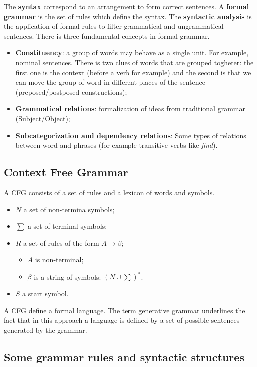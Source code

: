 
The \textbf{syntax} correspond to an arrangement to form correct sentences. A \textbf{formal grammar} is the set of rules which define the syntax. The \textbf{syntactic analysis} is the application of formal rules to filter grammatical and ungrammatical sentences. There is three fundamental concepts in formal grammar.

\begin{itemize}
	\item \textbf{Constituency}: a group of words may behave as a single unit. For example, nominal sentences. There is two clues of words that are grouped togheter: the first one is the context (before a verb for example) and the second is that we can move the group of word in different places of the sentence (preposed/postposed constructions);
	\item \textbf{Grammatical relations}: formalization of ideas from traditional grammar (Subject/Object);
	\item \textbf{Subcategorization and dependency relations}: Some types of relations between word and phrases (for example transitive verbs like \textit{find}).
\end{itemize}

\subsection{Context Free Grammar}

A CFG consists of a set of rules and a lexicon of words and symbols.
\begin{itemize}
	\item $N$ a set of non-termina symbols;
	\item $\sum$ a set of terminal symbols;
	\item $R$ a set of rules of the form $A \rightarrow \beta$;
	\begin{itemize}
		\item $A$ is non-terminal;
		\item $\beta$ is a string of symbols: $(N \cup \sum)^*$.
	\end{itemize}
	\item $S$ a start symbol.
\end{itemize}

A CFG define a formal language. The term generative grammar underlines the fact that in this approach a language is defined by a set of possible sentences generated by the grammar.

\subsection{Some grammar rules and syntactic structures}

